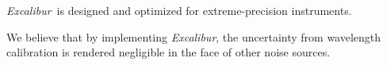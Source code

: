 \documentclass[modern]{aastex63}
\newcommand{\project}[1]{\textsl{#1}}
\newcommand{\name}{\project{Excalibur}}
\begin{document}
\name\ is designed and optimized for extreme-precision instruments.  

We believe that by implementing \name, the uncertainty from wavelength calibration is rendered negligible in the face of other noise sources.





\end{document}
